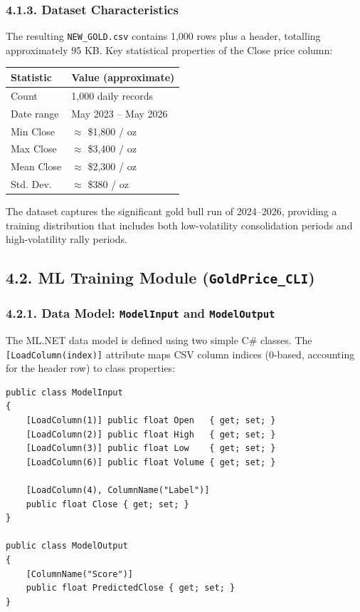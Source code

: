 \subsubsection{4.1.3. Dataset Characteristics}
The resulting \texttt{NEW\_GOLD.csv} contains 1,000 rows plus a header, totalling approximately 95 KB. Key statistical properties of the Close price column:

\begin{center}
\begin{tabular}{|l|l|}
\hline
\textbf{Statistic} & \textbf{Value (approximate)}\\
\hline
Count & 1,000 daily records\\
Date range & May 2023 -- May 2026\\
Min Close & $\approx$ \$1,800 / oz\\
Max Close & $\approx$ \$3,400 / oz\\
Mean Close & $\approx$ \$2,300 / oz\\
Std. Dev. & $\approx$ \$380 / oz\\
\hline
\end{tabular}
\end{center}

The dataset captures the significant gold bull run of 2024--2026, providing a training distribution that includes both low-volatility consolidation periods and high-volatility rally periods.

\subsection{4.2. ML Training Module (\texttt{GoldPrice\_CLI})}

\subsubsection{4.2.1. Data Model: \texttt{ModelInput} and \texttt{ModelOutput}}
The ML.NET data model is defined using two simple C\# classes. The \texttt{[LoadColumn(index)]} attribute maps CSV column indices (0-based, accounting for the header row) to class properties:

\begin{lstlisting}
public class ModelInput
{
    [LoadColumn(1)] public float Open   { get; set; }
    [LoadColumn(2)] public float High   { get; set; }
    [LoadColumn(3)] public float Low    { get; set; }
    [LoadColumn(6)] public float Volume { get; set; }
    
    [LoadColumn(4), ColumnName("Label")]
    public float Close { get; set; }
}

public class ModelOutput
{
    [ColumnName("Score")]
    public float PredictedClose { get; set; }
}
\end{lstlisting}

